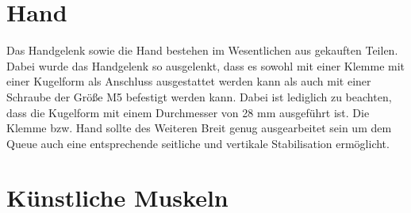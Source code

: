 	\section{Hand}
	Das Handgelenk sowie die Hand bestehen im Wesentlichen aus gekauften Teilen.
	Dabei wurde das Handgelenk so ausgelenkt, dass es sowohl mit einer Klemme mit einer Kugelform als Anschluss ausgestattet werden kann als auch mit einer Schraube der Größe M5 befestigt werden kann.
	Dabei ist lediglich zu beachten, dass die Kugelform mit einem Durchmesser von 28 mm ausgeführt ist.
	Die Klemme bzw. Hand sollte des Weiteren Breit genug ausgearbeitet sein um dem Queue auch eine entsprechende seitliche und vertikale Stabilisation ermöglicht. 
	\section{Künstliche Muskeln}